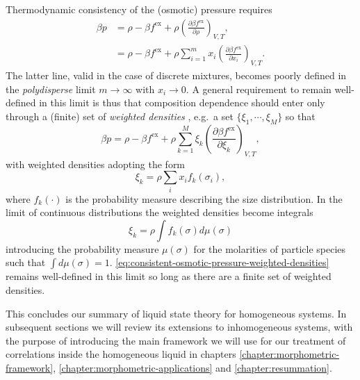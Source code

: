 Thermodynamic consistency of the (osmotic) pressure requires
\begin{subequations}
  \begin{align}
    \label{eq:consistent-osmotic-pressure}
    \beta p
    &=
    \rho - \beta f^\mathrm{ex}
    + \rho \left( \frac{\partial \beta f^\mathrm{ex}}{\partial \rho} \right)_{V,T},
    \\
    \label{eq:consistent-osmotic-pressure-mixtures}
    &=
    \rho - \beta f^\mathrm{ex}
    + \rho \sum_{i=1}^m
    x_i \left( \frac{\partial \beta f^\mathrm{ex}}{\partial x_i} \right)_{V,T}.
  \end{align}
\end{subequations}
The latter line, valid in the case of discrete mixtures, becomes poorly defined in the \emph{polydisperse} limit $m \to \infty$ with $x_i \to 0$.
A general requirement to remain well-defined in this limit is thus that composition dependence should enter only through a (finite) set of \emph{weighted densities} \cite{GualtieriJCP1982, WarrenPRL1998, SollichPRL1998, SollichAiCP2001}, e.g.\ a set $\{\xi_1, \cdots, \xi_M\}$ so that
\begin{equation}\label{eq:consistent-osmotic-pressure-weighted-densities}
  \beta p
  =
  \rho - \beta f^\mathrm{ex}
  + \rho \sum_{k=1}^M
  \xi_k \left( \frac{\partial \beta f^\mathrm{ex}}{\partial \xi_k} \right)_{V,T},
\end{equation}
with weighted densities adopting the form
\begin{equation*}
  \xi_k
  =
  \rho \sum_i x_i f_k(\sigma_i),
\end{equation*}
where $f_k(\cdot)$ is the probability measure describing the size distribution.
In the limit of continuous distributions the weighted densities become integrals
\begin{equation*}
  \xi_k
  =
  \rho \int f_k(\sigma) d\mu(\sigma)
\end{equation*}
introducing the probability measure $\mu(\sigma)$ for the molarities of particle species such that $\int d\mu(\sigma) = 1$.
\eqref{eq:consistent-osmotic-pressure-weighted-densities} remains well-defined in this limit so long as there are a finite set of weighted densities.

This concludes our summary of liquid state theory for homogeneous systems.
In subsequent sections we will review its extensions to inhomogeneous systems, with the purpose of introducing the main framework we will use for our treatment of correlations inside the homogeneous liquid in chapters \ref{chapter:morphometric-framework}, \ref{chapter:morphometric-applications} and \ref{chapter:resummation}.
